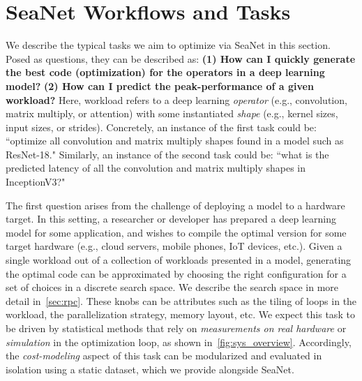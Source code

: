 
\section{SeaNet Workflows and Tasks}
\label{sec:tasks}
We describe the typical tasks we aim to optimize via SeaNet in this section.
Posed as questions, they can be described as: \textbf{(1) How can I quickly generate the best code (optimization) for the operators in a deep learning model?} \textbf{(2) How can I predict the peak-performance of a given workload?}
Here, workload refers to a deep learning \emph{operator} (e.g., convolution, matrix multiply, or attention) with some instantiated \emph{shape} (e.g., kernel sizes, input sizes, or strides). 
Concretely, an instance of the first task could be: ``optimize all convolution and matrix multiply shapes found in a model such as ResNet-18."
Similarly, an instance of the second task could be: ``what is the predicted latency of all the convolution and matrix multiply shapes in InceptionV3?"


The first question arises from the challenge of deploying a model to a hardware target.
In this setting, a researcher or developer has prepared a deep learning model for some application, and wishes to compile the optimal version for some target hardware (e.g., cloud servers, mobile phones, IoT devices, etc.).
Given a single workload out of a collection of workloads presented in a model, generating the optimal code can be approximated by choosing the right configuration for a set of choices in a discrete search space.
We describe the search space in more detail in~\autoref{sec:rpc}.
These knobs can be attributes such as the tiling of loops in the workload, the parallelization strategy, memory layout, etc.
We expect this task to be driven by statistical methods that rely on \emph{measurements on real hardware} or \emph{simulation} in the optimization loop, as shown in~\autoref{fig:sys_overview}.
Accordingly, the \emph{cost-modeling} aspect of this task can be modularized and evaluated in isolation using a static dataset, which we provide alongside SeaNet.


